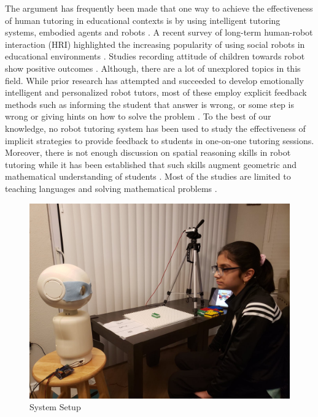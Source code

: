The argument has frequently been made that one way to achieve the effectiveness of human tutoring in educational contexts is by using intelligent tutoring systems, embodied agents and robots \cite{intro1}. A recent survey of long-term human-robot interaction (HRI) highlighted the increasing popularity of using social robots in educational environments \cite{survey1}. Studies recording attitude of children towards robot show positive outcomes \cite{oh2010social}. Although, there are a lot of unexplored topics in this field. While prior research has attempted and succeeded to develop emotionally intelligent and personalized robot tutors, most of these employ explicit feedback methods such as informing the student that answer is wrong, or some step is wrong or giving hints on how to solve the problem \parencite{gordon2016affective}\parencite{ramachandran2019personalized}. To the best of our knowledge, no robot tutoring system has been used to study the effectiveness of implicit strategies to provide feedback to students in one-on-one tutoring sessions. Moreover, there is not enough discussion on spatial reasoning skills \parencite{yilmaz2017development} in robot tutoring while it has been established that such skills augment geometric and mathematical understanding of students \parencite{keren2012kindergarten}. Most of the studies are limited to teaching languages \parencite{gordon2016affective} and solving mathematical problems \parencite{ramachandran2019personalized}. \\
\begin{figure}[h]
   \centering
   \includegraphics[width = 1\textwidth,trim={2cm 0 4cm 5cm},clip]{figures/s1.jpg}
   \caption[{System Setup}]{System Setup}
   \label{fig:fig_1-1}
\end{figure}
